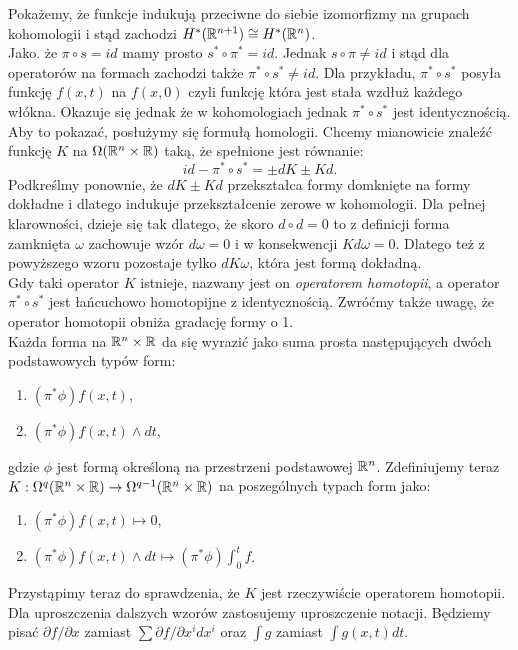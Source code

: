 \documentclass[licencjacka]{pracamgr}
\theoremstyle{definition}
\theoremstyle{definition}
\theoremstyle{plain}
\theoremstyle{plain}
\theoremstyle{plain}
\theoremstyle{plain}
\def\R{\ensuremath\mathbb{R}}
\begin{document}
Pokażemy, że funkcje indukują przeciwne do siebie izomorfizmy na
grupach kohomologii i stąd zachodzi $H^\ast(\R^{n+1}) \cong H^\ast(\R^{n})$. \\

Jako. że $\pi \circ s = id$  mamy prosto $s^\ast \circ \pi^\ast = id$. Jednak
$s \circ \pi \neq id$ i stąd dla operatorów
na formach zachodzi także $\pi^\ast \circ s^\ast \neq id$. Dla przykładu,
$\pi^\ast \circ s^\ast$ posyła funkcję $f(x, t)$ na $f(x, 0)$ czyli 
funkcję która jest stała wzdłuż każdego włókna. Okazuje się jednak
że w kohomologiach jednak $\pi^\ast \circ s^\ast$ jest identycznością.
Aby to pokazać, posłużymy się formułą homologii. Chcemy mianowicie
znaleźć funkcję $K$ na $\Omega(\R^n \times \R)$ taką, że spełnione jest
równanie:
\[
    id- \pi^\ast \circ s^\ast = \pm dK \pm Kd.
\]
Podkreślmy ponownie, że $dK \pm Kd$ przekształca formy domknięte
na formy dokładne i dlatego indukuje przekształcenie zerowe w kohomologii. 
Dla pełnej klarowności, dzieje się tak dlatego, że skoro $d \circ d = 0$
to z definicji forma zamknięta $\omega$ zachowuje wzór $d \omega = 0$ i
w konsekwencji $K d \omega = 0$. Dlatego też z powyższego wzoru pozostaje
tylko $d K \omega$, która jest formą dokładną. \\

Gdy taki operator $K$ istnieje, nazwany jest on \emph{operatorem homotopii},
a operator $\pi^\ast \circ s^\ast$ jest łańcuchowo homotopijne z identycznością.
Zwróćmy także uwagę, że operator homotopii obniża gradację formy o 1. \\

Każda forma na $\R^n \times \R$ da się wyrazić jako suma prosta następujących
dwóch podstawowych typów form:

\begin{enumerate}
    \item $(\pi^\ast \phi)f(x,t)$, 
    \item $(\pi^\ast \phi)f(x,t) \wedge dt$,
\end{enumerate}

gdzie $\phi$ jest formą określoną na przestrzeni podstawowej $\R^n$.
Zdefiniujemy teraz
$K: \Omega^{q} (\R^n \times \R) \rightarrow \Omega^{q-1} (\R^n \times \R)$ 
na poszególnych typach form jako:
\begin{enumerate}
    \item $(\pi^\ast \phi)f(x,t) \mapsto 0$,
    \item $(\pi^\ast \phi)f(x,t) \wedge dt \mapsto (\pi^\ast \phi) \int_0^t f$.
\end{enumerate}
Przystąpimy teraz do sprawdzenia, że $K$ jest rzeczywiście operatorem homotopii.
Dla uproszczenia dalszych wzorów zastosujemy uproszczenie notacji. Będziemy
pisać $\partial f / \partial x$ zamiast $\sum \partial f / \partial x^i dx^i$
oraz $\int g$ zamiast $\int g(x, t) dt$. \\
\end{document}
